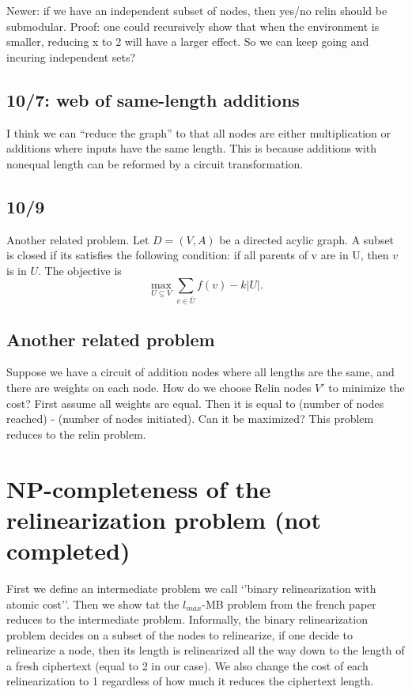 \documentclass[11pt]{article} %
\theoremstyle{plain}
\theoremstyle{definition}
\begin{document}
Newer: if we have an independent subset of nodes, then yes/no relin should be submodular. Proof: one could recursively show that when the environment is smaller, reducing x to 2 will have a larger effect. 
So we can keep going and incuring independent sets? 

\subsection{10/7: web of same-length additions}

I think we can ``reduce the graph'' to that all nodes are either multiplication or additions where inputs have the same length. This is because additions with nonequal length can be reformed by a circuit transformation. 

\subsection{10/9}

Another related problem. Let $D = (V,A)$ be a directed acylic graph. A subset 
is closed if its satisfies the following condition: if all parents of v are in U, then $v$ is in $U$. The objective is 
\[
	\max_{U \subseteq V} \sum_{v \in \bar{U}} f(v)  - k |U|. 
\]


\subsection{Another related problem}

Suppose we have a circuit of addition nodes where all lengths are the same, and there are weights 
on each node. How do we choose Relin nodes $V'$ to minimize the cost? First assume all weights are 
equal. Then it is equal to (number of nodes reached) - (number of nodes initiated). Can it be maximized? 
This problem reduces to the relin problem. 



\section{NP-completeness of the relinearization problem (not completed)}

First we define an intermediate problem we call `'binary relinearization with atomic cost''. Then we show tat the $l_{max}$-MB problem from the french 
paper reduces to the intermediate problem. Informally, the binary relinearization problem decides on a subset of the nodes to relinearize, if one decide to relinearize a node, then its length is relinearized all the way down to the length of a fresh ciphertext (equal to 2 in our case). We also change the cost of each relinearization to 1 regardless of how much it reduces the ciphertext length. 
\end{document}
